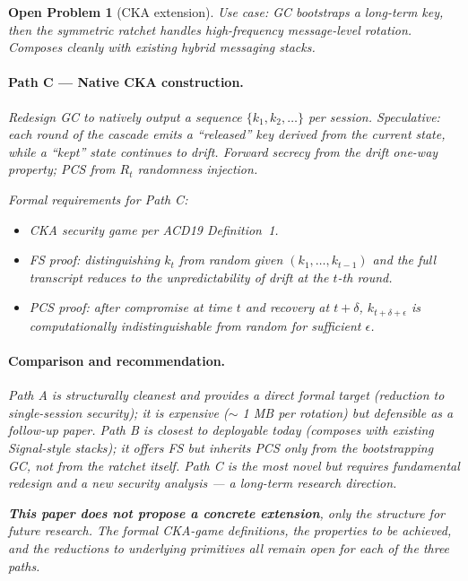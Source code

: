\documentclass[11pt,a4paper]{article}
\newtheorem{openproblem}{Open Problem}
\begin{document}
\begin{openproblem}[CKA extension]
\emph{Use case:} GC bootstraps a long-term key, then the symmetric ratchet handles high-frequency message-level rotation. Composes cleanly with existing hybrid messaging stacks.

\paragraph{Path C --- Native CKA construction.}
Redesign GC to natively output a sequence $\{k_1, k_2, \ldots\}$ per session. Speculative: each round of the cascade emits a ``released'' key derived from the current state, while a ``kept'' state continues to drift. Forward secrecy from the drift one-way property; PCS from $R_t$ randomness injection.

\emph{Formal requirements for Path C:}
\begin{itemize}[leftmargin=*]
\item CKA security game per ACD19 Definition~1.
\item FS proof: distinguishing $k_t$ from random given $(k_1, \ldots, k_{t-1})$ and the full transcript reduces to the unpredictability of drift at the $t$-th round.
\item PCS proof: after compromise at time $t$ and recovery at $t+\delta$, $k_{t+\delta+\epsilon}$ is computationally indistinguishable from random for sufficient $\epsilon$.
\end{itemize}

\paragraph{Comparison and recommendation.}
Path A is structurally cleanest and provides a direct formal target (reduction to single-session security); it is expensive ($\sim$ 1 MB per rotation) but defensible as a follow-up paper. Path B is closest to deployable today (composes with existing Signal-style stacks); it offers FS but inherits PCS only from the bootstrapping GC, not from the ratchet itself. Path C is the most novel but requires fundamental redesign and a new security analysis --- a long-term research direction.

\textbf{This paper does not propose a concrete extension}, only the structure for future research. The formal CKA-game definitions, the properties to be achieved, and the reductions to underlying primitives all remain open for each of the three paths.
\end{openproblem}
\end{document}

